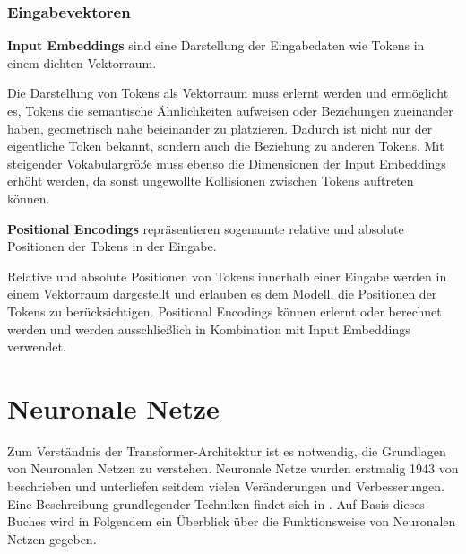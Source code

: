 \subsubsection{Eingabevektoren}

\begin{definition}\label{def:input-embeddings}
    \textbf{Input Embeddings} sind eine Darstellung der Eingabedaten wie Tokens in einem dichten Vektorraum.
\end{definition}
Die Darstellung von Tokens als Vektorraum muss erlernt werden und ermöglicht es,
Tokens die semantische Ähnlichkeiten aufweisen oder Beziehungen zueinander haben, geometrisch nahe beieinander zu platzieren.
Dadurch ist nicht nur der eigentliche Token bekannt, sondern auch die Beziehung zu anderen Tokens. Mit steigender Vokabulargröße muss ebenso die Dimensionen der Input Embeddings erhöht werden, da sonst ungewollte Kollisionen zwischen Tokens auftreten können.

\begin{definition}\label{def:positional-encodings}
    \textbf{Positional Encodings} repräsentieren sogenannte relative und absolute Positionen der Tokens in der Eingabe.
\end{definition}
Relative und absolute Positionen von Tokens innerhalb einer Eingabe werden in einem Vektorraum dargestellt und erlauben es dem Modell, die Positionen der Tokens zu berücksichtigen.
Positional Encodings können erlernt oder berechnet werden und werden ausschließlich in Kombination mit Input Embeddings verwendet.

\section{Neuronale Netze}\label{sec:neuronale-netze}
Zum Verständnis der Transformer-Architektur ist es notwendig, die Grundlagen von Neuronalen Netzen zu verstehen.
Neuronale Netze wurden erstmalig 1943 von \citet{neuronal_networks_first} beschrieben und unterliefen seitdem vielen Veränderungen und Verbesserungen.
Eine Beschreibung grundlegender Techniken findet sich in \citet{neuronale-netze}.
Auf Basis dieses Buches wird in Folgendem ein Überblick über die Funktionsweise von Neuronalen Netzen gegeben.\\

